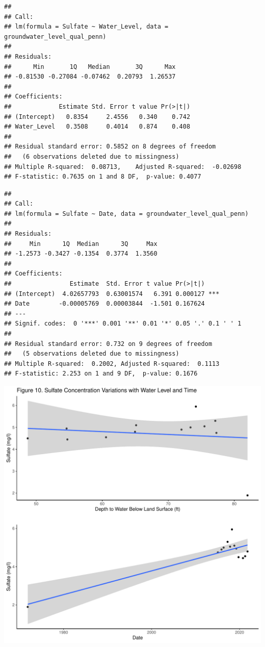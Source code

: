 \documentclass[
  12pt,
]{article}
\begin{document}
\newpage

\begin{verbatim}
## 
## Call:
## lm(formula = Sulfate ~ Water_Level, data = groundwater_level_qual_penn)
## 
## Residuals:
##      Min       1Q   Median       3Q      Max 
## -0.81530 -0.27084 -0.07462  0.20793  1.26537 
## 
## Coefficients:
##             Estimate Std. Error t value Pr(>|t|)
## (Intercept)   0.8354     2.4556   0.340    0.742
## Water_Level   0.3508     0.4014   0.874    0.408
## 
## Residual standard error: 0.5852 on 8 degrees of freedom
##   (6 observations deleted due to missingness)
## Multiple R-squared:  0.08713,    Adjusted R-squared:  -0.02698 
## F-statistic: 0.7635 on 1 and 8 DF,  p-value: 0.4077
\end{verbatim}

\begin{verbatim}
## 
## Call:
## lm(formula = Sulfate ~ Date, data = groundwater_level_qual_penn)
## 
## Residuals:
##     Min      1Q  Median      3Q     Max 
## -1.2573 -0.3427 -0.1354  0.3774  1.3560 
## 
## Coefficients:
##                Estimate  Std. Error t value Pr(>|t|)    
## (Intercept)  4.02657793  0.63001574   6.391 0.000127 ***
## Date        -0.00005769  0.00003844  -1.501 0.167624    
## ---
## Signif. codes:  0 '***' 0.001 '**' 0.01 '*' 0.05 '.' 0.1 ' ' 1
## 
## Residual standard error: 0.732 on 9 degrees of freedom
##   (5 observations deleted due to missingness)
## Multiple R-squared:  0.2002, Adjusted R-squared:  0.1113 
## F-statistic: 2.253 on 1 and 9 DF,  p-value: 0.1676
\end{verbatim}

\newpage

\includegraphics{Draft_Final_files/figure-latex/linear_m2-1.pdf}
\end{document}
